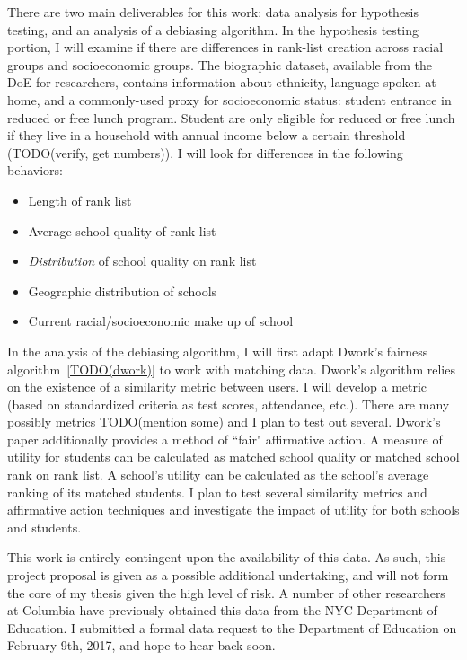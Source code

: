 There are two main deliverables for this work: data analysis for hypothesis testing, and an analysis of a debiasing algorithm.
In the hypothesis testing portion, I will examine if there are differences in rank-list creation across racial groups and socioeconomic groups.
The biographic dataset, available from the DoE for researchers, contains information about ethnicity, language spoken at home, and a commonly-used proxy for socioeconomic status: student entrance in reduced or free lunch program.
Student are only eligible for reduced or free lunch if they live in a household with annual income below a certain threshold (TODO(verify, get numbers)).
I will look for differences in the following behaviors:
\begin{itemize}
  \item Length of rank list
  \item Average school quality of rank list
  \item \emph{Distribution} of school quality on rank list
  \item Geographic distribution of schools
  \item Current racial/socioeconomic make up of school
\end{itemize}

In the analysis of the debiasing algorithm, I will first adapt Dwork's fairness algorithm~\ref{TODO(dwork)} to work with matching data.
Dwork's algorithm relies on the existence of a similarity metric between users.
I will develop a metric (based on standardized criteria as test scores, attendance, etc.).
There are many possibly metrics TODO(mention some) and I plan to test out several.
Dwork's paper additionally provides a method of ``fair" affirmative action.
A measure of utility for students can be calculated as matched school quality or matched school rank on rank list.
A school's utility can be calculated as the school's average ranking of its matched students.
I plan to test several similarity metrics and affirmative action techniques and investigate the impact of utility for both schools and students.

This work is entirely contingent upon the availability of this data.
As such, this project proposal is given as a possible additional undertaking, and will not form the core of my thesis given the high level of risk.
A number of other researchers at Columbia have previously obtained this data from the NYC Department of Education.
I submitted a formal data request to the Department of Education on February 9th, 2017, and hope to hear back soon.

